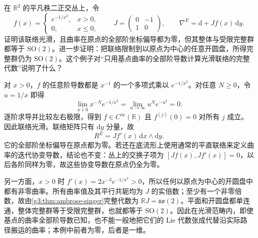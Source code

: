 \begin{exercise}\label{g3:ex:smooth-flat-curvature-jet}
	在 \(\mathbb R^2\) 的平凡秩二正交丛上，令
	\[
		f(x)=\begin{cases}e^{-1/x^2},&x>0,\\0,&x\leq0,\end{cases}
		\qquad J=\begin{pmatrix}0&-1\\1&0\end{pmatrix},
		\qquad \nabla^E=\mathrm d+Jf(x)\,\mathrm dy.
	\]
	证明该联络光滑，且曲率在原点的全部阶坐标偏导都为零，但其整体与受限完整群都等于 \(\mathrm{SO}(2)\)。进一步证明：把联络限制到以原点为中心的任意开圆盘，所得完整群仍为 \(\mathrm{SO}(2)\)。这个例子对“只用基点曲率的全部阶导数计算光滑联络的完整代数”说明了什么？
\end{exercise}
\begin{solution}
	对 \(x>0\)，\(f\) 的任意阶导数都是 \(x^{-1}\) 的一个多项式乘以 \(e^{-1/x^2}\)。对任意 \(N\geq0\)，令 \(u=1/x\) 即得
	\[
		\lim_{x\downarrow0}x^{-N}e^{-1/x^2}
		=\lim_{u\to\infty}u^Ne^{-u^2}=0.
	\]
	逐阶求导并比较左右极限，得到 \(f\in C^\infty(\mathbb R)\) 且 \(f^{(j)}(0)=0\) 对所有 \(j\) 成立。因此联络光滑。联络矩阵只有 \(\mathrm dy\) 分量，故
	\[
		R^E=Jf'(x)\,\mathrm dx\wedge\mathrm dy.
	\]
	它的全部阶坐标偏导在原点都为零。若还在底流形上使用通常的平直联络来定义曲率的迭代协变导数，结论也不变：丛上的交换子项为 \([Jf(x),Jf'(x)]=0\)，以后各阶同样为零，故这些协变导数在原点仍全为零。

	另一方面，\(x>0\) 时 \(f'(x)=2x^{-3}e^{-1/x^2}>0\)，所以任何以原点为中心的开圆盘中都有非零曲率。所有曲率值及其平行共轭均为 \(J\) 的实倍数；至少有一个非零倍数，故由\cref{g3:thm:ambrose-singer}完整代数为 \(\mathbb RJ=\mathfrak{so}(2)\)。平面和开圆盘都单连通，整体完整群等于受限完整群，也就都等于 \(\mathrm{SO}(2)\)。因此在光滑范畴内，即使基点的曲率全部阶导数已知，也不能一般地把它们的 Lie 代数张成代替沿实际路径搬运的曲率；本例中前者为零，后者是一维。
\end{solution}

